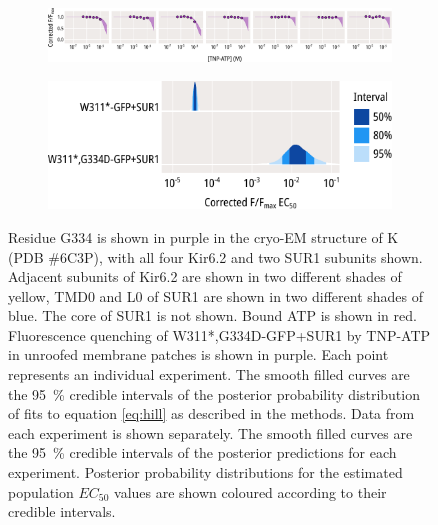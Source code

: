 \begin{figure}[h]
\begin{subfigure}[t]{0.45\textwidth}
	\end{subfigure}
	\vfill
	\begin{subfigure}[t]{0.9\textwidth}
		\caption{}\label{ch5fig:g334d_indfits}
		\centering
		\includegraphics[width=\textwidth]{g334d_3.pdf}
	\end{subfigure}
	\vfill
	\begin{subfigure}[t]{0.7\textwidth}
		\caption{}\label{ch5fig:g334d_params}
		\centering
		\includegraphics[width=\textwidth]{g334d_4.pdf}
	\end{subfigure}
	\caption[G334D abolishes nucleotide binding at Kir6.2]{
	 Residue G334 is shown in purple in the cryo-EM structure of K\ATP{} (PDB \#6C3P), with all four Kir6.2 and two SUR1 subunits shown.
	Adjacent subunits of Kir6.2 are shown in two different shades of yellow, TMD0 and L0 of SUR1 are shown in two different shades of blue.
	The core of SUR1 is not shown.
	Bound ATP is shown in red.
	 Fluorescence quenching of W311*,G334D-GFP+SUR1 by TNP-ATP in unroofed membrane patches is shown in purple.
	Each point represents an individual experiment.
	The smooth filled curves are the \SI{95}{\percent} credible intervals of the posterior probability distribution of fits to equation \ref{eq:hill} as described in the methods.
	 Data from each experiment is shown separately.
	The smooth filled curves are the \SI{95}{\percent} credible intervals of the posterior predictions for each experiment.
	 Posterior probability distributions for the estimated population $EC_{50}$ values are shown coloured according to their credible intervals.
	}\label{ch5fig:g334d}
\end{figure}


